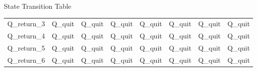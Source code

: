 \documentclass[10pt, a4paper]{article}
\begin{document}
\begin{section}{State Transition Table}
\begin{landscape}
\begin{longtable}[c]{llllllll}
Q\_return\_3     & Q\_quit          & Q\_quit          & Q\_quit          & Q\_quit          & Q\_quit       & Q\_quit       & Q\_quit  \\
Q\_return\_4     & Q\_quit          & Q\_quit          & Q\_quit          & Q\_quit          & Q\_quit       & Q\_quit       & Q\_quit  \\
Q\_return\_5     & Q\_quit          & Q\_quit          & Q\_quit          & Q\_quit          & Q\_quit       & Q\_quit       & Q\_quit  \\
Q\_return\_6     & Q\_quit          & Q\_quit          & Q\_quit          & Q\_quit          & Q\_quit       & Q\_quit       & Q\_quit 
\end{longtable}
\end{landscape}

\newpage


\end{section}
\end{document}
